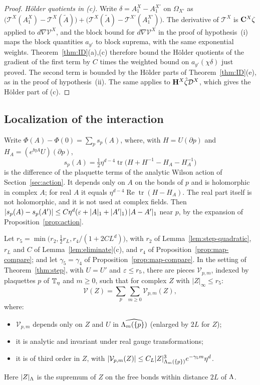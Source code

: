 \begin{proof}
\emph{H\"older quotients in (c).} Write $\delta=A_1^X-A_1^{X'}$ on $\Omega_{X'}$ as $\big(\mathcal T^X(A^X_1)-\mathcal T^X(\tilde A)\big)+\big(\mathcal T^X(\tilde A)-\mathcal T^{X'}(A^{X'}_1)\big)$. The derivative of $\mathcal T^X$ is $\mathbf C^X\zeta$ applied to $d\nabla\mathcal V^X$, and the block bound for $d\nabla\mathcal V^X$ in the proof of hypothesis~(i) maps the block quantities $a_{y'}$ to block suprema, with the same exponential weights. Theorem~\ref{thm:ID}(a),(c) therefore bound the H\"older quotients of the gradient of the first term by $C$ times the weighted bound on $a_{y'}(\chi\delta)$ just proved. The second term is bounded by the H\"older parts of Theorem~\ref{thm:ID}(e), as in the proof of hypothesis~(ii). The same applies to $\mathbf H^X\hat\zeta\mathcal D^X$, which gives the H\"older part of (c).
\end{proof}

\subsection{Localization of the interaction}

Write $\Phi(A)-\Phi(0)=\sum_ps_p(A)$, where, with $H=U(\partial p)$ and $H_A=(e^{\ii\eta A}U)(\partial p)$,
\[
s_p(A)=\tfrac12\eta^{d-4}\operatorname{tr}\big(H+H^{-1}-H_A-H_A^{-1}\big)
\]
is the difference of the plaquette terms of the analytic Wilson action of Section~\ref{sec:action}. It depends only on $A$ on the bonds of $p$ and is holomorphic in complex $A$; for real $A$ it equals $\eta^{d-4}\operatorname{Re}\operatorname{tr}(H-H_A)$. The real part itself is not holomorphic, and it is not used at complex fields. Then $|s_p(A)-s_p(A')|\le C\eta^d(\varepsilon+|A|_1+|A'|_1)\,|A-A'|_1$ near $p$, by the expansion of Proposition~\ref{prop:action}.

\begin{theorem}\label{thm:interaction-local}
Let $r_5=\min\big(r_2,\frac12r_L,r_4/(1+2CL^d)\big)$, with $r_2$ of Lemma~\ref{lem:step-quadratic}, $r_L$ and $C$ of Lemma~\ref{lem:eliminate}(c), and $r_4$ of Proposition~\ref{prop:map-compare}; and let $\gamma_5=\gamma_4$ of Proposition~\ref{prop:map-compare}. In the setting of Theorem~\ref{thm:step}, with $U=U'$ and $\varepsilon\le r_5$, there are pieces $\mathcal V_{p,m}$, indexed by plaquettes $p$ of $\mathbb T_\eta$ and $m\ge0$, such that for complex $Z$ with $|Z|_\infty\le r_5$:
\[
\mathcal V(Z)=\sum_p\sum_{m\ge0}\mathcal V_{p,m}(Z),
\]
where:
\begin{itemize}
\item $\mathcal V_{p,m}$ depends only on $Z$ and $U$ in $\widehat{\Lambda_m(\{p\})}$ (enlarged by $2L$ for $Z$);
\item it is analytic and invariant under real gauge transformations;
\item it is of third order in $Z$, with $|\mathcal V_{p,m}(Z)|\le C_L|Z|^3_{\Lambda_m(\{p\})}e^{-\gamma_5m}\eta^d$.
\end{itemize}
Here $|Z|_{\Lambda}$ is the supremum of $Z$ on the free bonds within distance $2L$ of $\Lambda$.
\end{theorem}

